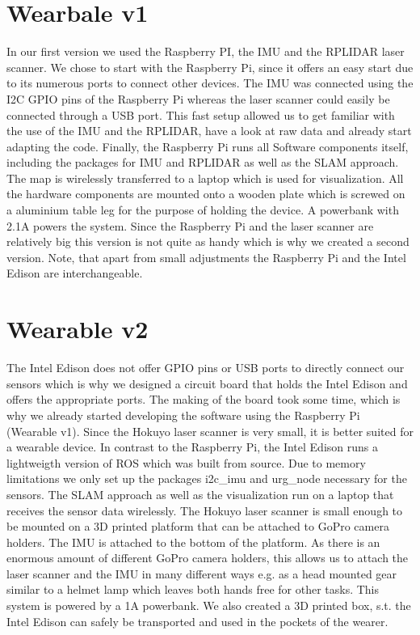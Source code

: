 \documentclass{sigchi-ext}
\begin{document}
\section{Wearbale v1}
In our first version we used the Raspberry PI, the IMU and the RPLIDAR laser scanner. We chose to start with the Raspberry Pi, since it offers an easy start due to its numerous ports to connect other devices. The IMU was connected using the I2C GPIO pins of the Raspberry Pi whereas the laser scanner could easily be connected through a USB port. This fast setup allowed us to get familiar with the use of the IMU and the RPLIDAR, have a look at raw data and already start adapting the code. Finally, the Raspberry Pi runs all Software components itself, including the packages for IMU and RPLIDAR as well as the SLAM approach. The map is wirelessly transferred to a laptop which is used for visualization. All the hardware components are mounted onto a wooden plate which is screwed on a aluminium table leg for the purpose of holding the device. A powerbank with 2.1A powers the system. Since the Raspberry Pi and the laser scanner are relatively big this version is not quite as handy which is why we created a second version. Note, that apart from small adjustments the Raspberry Pi and the Intel Edison are interchangeable.

\section{Wearable v2}
The Intel Edison does not offer GPIO pins or USB ports to directly connect our sensors which is why we designed a circuit board that holds the Intel Edison and offers the appropriate ports. The making of the board took some time, which is why we already started developing the software using the Raspberry Pi (Wearable v1). Since the Hokuyo laser scanner is very small, it is better suited for a wearable device. In contrast to the Raspberry Pi, the Intel Edison runs a lightweigth version of ROS which was built from source. Due to memory limitations we only set up the packages i2c\_imu and urg\_node necessary for the sensors.
The SLAM approach as well as the visualization run on a laptop that receives the sensor data wirelessly. The Hokuyo laser scanner is small enough to be mounted on a 3D printed platform that can be attached to GoPro camera holders. The IMU is attached to the bottom of the platform. As there is an enormous amount of different GoPro camera holders, this allows us to attach the laser scanner and the IMU in many different ways e.g. as a head mounted gear similar to a helmet lamp which leaves both hands free for other tasks. This system is powered by a 1A powerbank. We also created a 3D printed box, s.t. the Intel Edison can safely be transported and used in the pockets of the wearer. 
\end{document}

